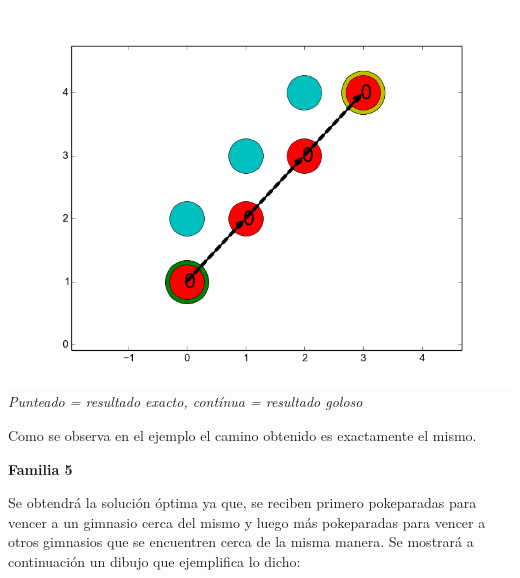    \vspace*{0.3cm} \vspace*{0.3cm}
  \begin{center}
\includegraphics[scale=0.40]{./EJ2/todos0.png}
\\{\textit{Punteado = resultado exacto, contínua = resultado goloso}}
  \end{center}
  \vspace*{0.3cm}

Como se observa en el ejemplo el camino obtenido es exactamente el mismo.

\begin{center}
\textbf{Familia 5}
\end{center}

Se obtendr\'a la soluci\'on \'optima ya que, se reciben primero pokeparadas para vencer a un gimnasio cerca del mismo y luego m\'as pokeparadas para vencer a otros gimnasios que se encuentren cerca de la misma manera. Se mostrar\'a a continuaci\'on un dibujo que ejemplifica lo dicho:

